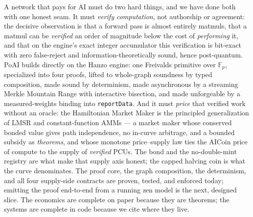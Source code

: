 \documentclass[11pt]{article}
\newcommand{\Fp}{\ensuremath{\mathbb{F}_p}}
\newcommand{\code}[1]{\texttt{#1}}
\begin{document}
A network that pays for AI must do two hard things, and we have done both with one
honest seam. It must \emph{verify computation}, not authorship or agreement: the
decisive observation is that a forward pass is almost entirely matmuls, that a
matmul can be \emph{verified} an order of magnitude below the cost of
\emph{performing} it, and that on the engine's exact integer accumulator this
verification is bit-exact with zero false-reject and information-theoretically
sound, hence post-quantum. PoAI builds directly on the Hanzo engine: one Freivalds
primitive over $\Fp$, specialized into four proofs, lifted to whole-graph
soundness by typed composition, made sound by determinism, made asynchronous by a
streaming Merkle Mountain Range with interactive bisection, and made unforgeable by
a measured-weights binding into \code{reportData}. And it must \emph{price} that
verified work without an oracle: the Hamiltonian Market Maker is the principled
generalization of LMSR and constant-function AMMs --- a market maker whose conserved
bonded value gives path independence, no in-curve arbitrage, and a bounded
subsidy as \emph{theorems}, and whose monotone price--supply law ties the AICoin
price of compute to the supply of \emph{verified} PCUs. The bond and the
no-double-mint registry are what make that supply axis honest; the capped halving
coin is what the curve denominates. The proof core, the graph composition, the
determinism, and all four supply-side contracts are proven, tested, and enforced
today; emitting the proof end-to-end from a running zen model is the next, designed
slice. The economics are complete on paper because they are theorems; the systems
are complete in code because we cite where they live.
\end{document}
